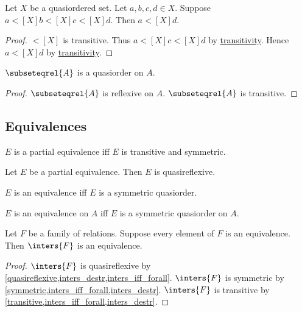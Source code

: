 \begin{lemma}\label{quasiorder_transitive_double}
    Let $X$ be a quasiordered set.
    Let $a, b, c, d \in X$.
    Suppose $a\mathrel{\lt[X]} b\mathrel{\lt[X]} c\mathrel{\lt[X]} d$.
    Then $a\mathrel{\lt[X]} d$.
\end{lemma}
\begin{proof}
    $\lt[X]$ is transitive.
    Thus $a\mathrel{\lt[X]} c\mathrel{\lt[X]} d$ by \hyperref[transitive]{transitivity}.
    Hence $a\mathrel{\lt[X]} d$ by \hyperref[transitive]{transitivity}.
\end{proof}

\begin{proposition}\label{subseteqrel_is_quasiorder}
    $\subseteqrel{A}$ is a quasiorder on $A$.
\end{proposition}
\begin{proof}
    $\subseteqrel{A}$ is reflexive on $A$.
    $\subseteqrel{A}$ is transitive.
\end{proof}

\subsection{Equivalences}

\begin{abbreviation}\label{partialequivalence}
    $E$ is a partial equivalence iff
    $E$ is transitive and symmetric.
\end{abbreviation}

\begin{proposition}\label{partialequivalence_is_quasireflexive}
    Let $E$ be a partial equivalence.
    Then $E$ is quasireflexive.
\end{proposition}

\begin{abbreviation}\label{equivalence}
    $E$ is an equivalence iff
    $E$ is a symmetric quasiorder.
\end{abbreviation}

\begin{abbreviation}\label{equivalence_on}
    $E$ is an equivalence on $A$ iff
    $E$ is a symmetric quasiorder on $A$.
\end{abbreviation}

\begin{proposition}\label{inters_of_family_of_equivalences_is_equivalence}
    Let $F$ be a family of relations.
    Suppose every element of $F$ is an equivalence.
    Then $\inters{F}$ is an equivalence.
\end{proposition}
\begin{proof}
    $\inters{F}$ is quasireflexive by \cref{quasireflexive,inters_destr,inters_iff_forall}.
    $\inters{F}$ is symmetric by \cref{symmetric,inters_iff_forall,inters_destr}.
    $\inters{F}$ is transitive by \cref{transitive,inters_iff_forall,inters_destr}.
\end{proof}

